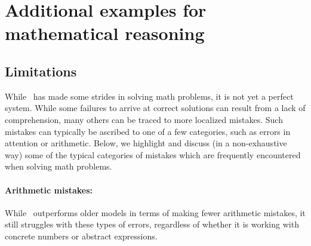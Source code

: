 \section{Additional examples for mathematical reasoning}\label{sec:math_appendix}

\subsection{Limitations}\label{sec:math-a1}

While \DV \ has made some strides in solving math problems, it is not yet a perfect system. While some failures to arrive at correct solutions can result from a lack of comprehension, many others can be traced to more localized mistakes. Such mistakes can typically be ascribed to one of a few categories, such as errors in attention or arithmetic. Below, we highlight and discuss (in a non-exhaustive way) some of the typical categories of mistakes which are frequently encountered when solving math problems.



\paragraph{Arithmetic mistakes:} While \DV \ outperforms older models in terms of making fewer arithmetic mistakes, it still struggles with these types of errors, regardless of whether it is working with concrete numbers or abstract expressions. 

\begin{comment}
Here, we observe that the main reason for such a mistake is not that \DV \ does not know how to do the calculation, but 
\begin{center}
\emph{\DV \ makes arithmetic mistakes mostly due to skipping steps.}
\end{center}
\end{comment}

